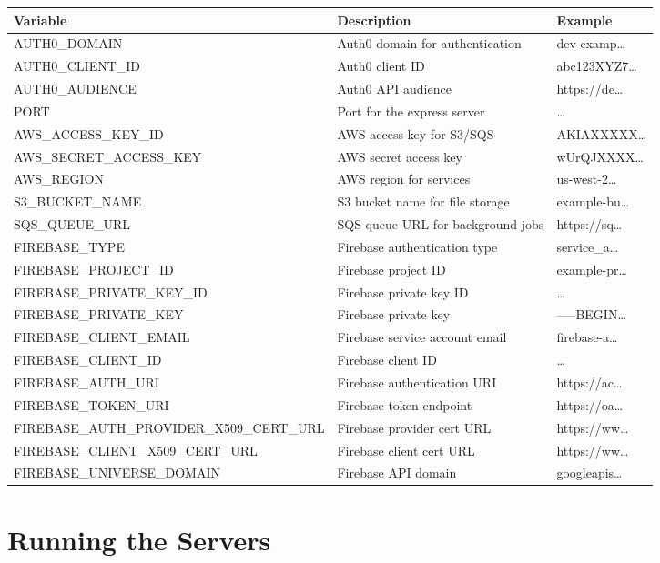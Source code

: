 \documentclass{article}
\begin{document}
\begin{tabularx}{\textwidth}{lX>{\ttfamily}X}
  \toprule
  \textbf{Variable} & \textbf{Description} & \textbf{Example} \\
  \midrule
  AUTH0\_DOMAIN & Auth0 domain for authentication & dev-examp\ldots \\
  AUTH0\_CLIENT\_ID & Auth0 client ID & abc123XYZ7\ldots \\
  AUTH0\_AUDIENCE & Auth0 API audience & https://de\ldots \\
  PORT & Port for the express server & 3001\ldots \\
  AWS\_ACCESS\_KEY\_ID & AWS access key for S3/SQS & AKIAXXXXX\ldots \\
  AWS\_SECRET\_ACCESS\_KEY & AWS secret access key & wUrQJXXXX\ldots \\
  AWS\_REGION & AWS region for services & us-west-2\ldots \\
  S3\_BUCKET\_NAME & S3 bucket name for file storage & example-bu\ldots \\
  SQS\_QUEUE\_URL & SQS queue URL for background jobs & https://sq\ldots \\
  FIREBASE\_TYPE & Firebase authentication type & service\_a\ldots \\
  FIREBASE\_PROJECT\_ID & Firebase project ID & example-pr\ldots \\
  FIREBASE\_PRIVATE\_KEY\_ID & Firebase private key ID & 123456789\ldots \\
  FIREBASE\_PRIVATE\_KEY & Firebase private key & -----BEGIN\ldots \\
  FIREBASE\_CLIENT\_EMAIL & Firebase service account email & firebase-a\ldots \\
  FIREBASE\_CLIENT\_ID & Firebase client ID & 123456789\ldots \\
  FIREBASE\_AUTH\_URI & Firebase authentication URI & https://ac\ldots \\
  FIREBASE\_TOKEN\_URI & Firebase token endpoint & https://oa\ldots \\
  FIREBASE\_AUTH\_PROVIDER\_X509\_CERT\_URL & Firebase provider cert URL & https://ww\ldots \\
  FIREBASE\_CLIENT\_X509\_CERT\_URL & Firebase client cert URL & https://ww\ldots \\
  FIREBASE\_UNIVERSE\_DOMAIN & Firebase API domain & googleapis\ldots \\
  \bottomrule
  \end{tabularx}
  

\section{Running the Servers}
\end{document}
